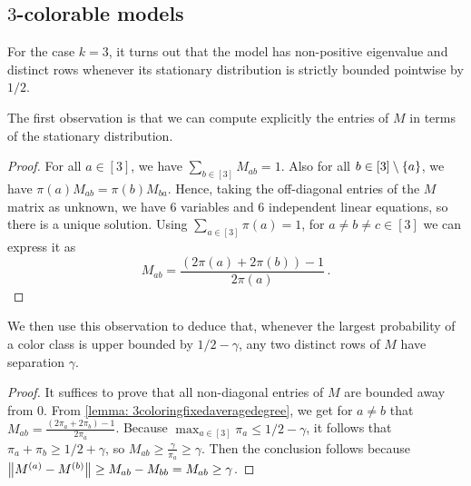 \subsection{$3$-colorable models}

For the case $k=3$, it turns out that the model has non-positive eigenvalue and distinct rows whenever its stationary distribution is strictly bounded pointwise by $1/2$. 

The first observation is that we can compute explicitly the entries of $M$ in terms of the stationary distribution.

\begin{proof}
    For all $a \in [3]$, we have $\sum_{b\in [3]}M_{ab}=1$.
    Also for all $b\in [3]\setminus\left\{a\right\}$, we have $\pi(a) M_{ab} = \pi(b) M_{ba}$.
    Hence, taking the off-diagonal entries of the $M$ matrix as unknown, we have $6$ variables and $6$ independent linear equations, so there is a unique solution.
    Using $\sum_{a\in[3]}\pi(a)=1$, for $a\neq b\neq c\in[3]$ we can express it as
    $$M_{ab}= \frac{(2\pi(a)+2\pi(b))-1}{2\pi(a)}\,.$$
\end{proof}

We then use this observation to deduce that, whenever the largest probability of a color class is upper bounded by $1/2-\gamma$, any two distinct rows of $M$ have separation $\gamma$.

\begin{proof}
It suffices to prove that all non-diagonal entries of $M$ are bounded away from $0$.
From \cref{lemma: 3coloringfixedaveragedegree}, we get for $a \neq b$ that $M_{ab} = \frac{(2\pi_a+2\pi_b)-1}{2\pi_a}$.
Because $\max_{a \in [3]} \pi_a \leq 1/2-\gamma$, it follows that $\pi_a+\pi_b \geq 1/2+\gamma$, so $M_{ab} \geq \frac{\gamma}{\pi_a} \geq \gamma$.
Then the conclusion follows because $\left\lVert M^{(a)} - M^{(b)}\right\rVert \geq M_{ab} - M_{bb} = M_{ab} \geq \gamma$.
\end{proof}


